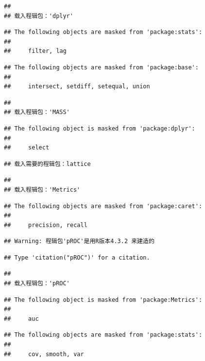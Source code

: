 \documentclass[
]{article}
\author{}
\date{\vspace{-2.5em}}
\begin{document}
\begin{verbatim}
## 
## 载入程辑包：'dplyr'
\end{verbatim}

\begin{verbatim}
## The following objects are masked from 'package:stats':
## 
##     filter, lag
\end{verbatim}

\begin{verbatim}
## The following objects are masked from 'package:base':
## 
##     intersect, setdiff, setequal, union
\end{verbatim}

\begin{verbatim}
## 
## 载入程辑包：'MASS'
\end{verbatim}

\begin{verbatim}
## The following object is masked from 'package:dplyr':
## 
##     select
\end{verbatim}

\begin{verbatim}
## 载入需要的程辑包：lattice
\end{verbatim}

\begin{verbatim}
## 
## 载入程辑包：'Metrics'
\end{verbatim}

\begin{verbatim}
## The following objects are masked from 'package:caret':
## 
##     precision, recall
\end{verbatim}

\begin{verbatim}
## Warning: 程辑包'pROC'是用R版本4.3.2 来建造的
\end{verbatim}

\begin{verbatim}
## Type 'citation("pROC")' for a citation.
\end{verbatim}

\begin{verbatim}
## 
## 载入程辑包：'pROC'
\end{verbatim}

\begin{verbatim}
## The following object is masked from 'package:Metrics':
## 
##     auc
\end{verbatim}

\begin{verbatim}
## The following objects are masked from 'package:stats':
## 
##     cov, smooth, var
\end{verbatim}
\end{document}

